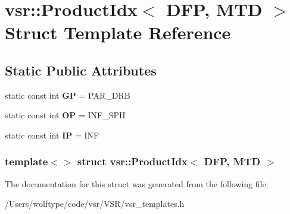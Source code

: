 \hypertarget{structvsr_1_1_product_idx_3_01_d_f_p_00_01_m_t_d_01_4}{\section{vsr\-:\-:Product\-Idx$<$ D\-F\-P, M\-T\-D $>$ Struct Template Reference}
\label{structvsr_1_1_product_idx_3_01_d_f_p_00_01_m_t_d_01_4}
}
\subsection*{Static Public Attributes}
\begin{DoxyCompactItemize}
\item 
\hypertarget{structvsr_1_1_product_idx_3_01_d_f_p_00_01_m_t_d_01_4_a7184cf9034f08618f0323b524c3aeefa}{static const int {\bfseries G\-P} = P\-A\-R\-\_\-\-D\-R\-B}\label{structvsr_1_1_product_idx_3_01_d_f_p_00_01_m_t_d_01_4_a7184cf9034f08618f0323b524c3aeefa}

\item 
\hypertarget{structvsr_1_1_product_idx_3_01_d_f_p_00_01_m_t_d_01_4_adbc8545fb0343cef9bbf375219e2a029}{static const int {\bfseries O\-P} = I\-N\-F\-\_\-\-S\-P\-H}\label{structvsr_1_1_product_idx_3_01_d_f_p_00_01_m_t_d_01_4_adbc8545fb0343cef9bbf375219e2a029}

\item 
\hypertarget{structvsr_1_1_product_idx_3_01_d_f_p_00_01_m_t_d_01_4_a17d82a1ccb0694bd093ae8bb2df9661e}{static const int {\bfseries I\-P} = I\-N\-F}\label{structvsr_1_1_product_idx_3_01_d_f_p_00_01_m_t_d_01_4_a17d82a1ccb0694bd093ae8bb2df9661e}

\end{DoxyCompactItemize}
\subsubsection*{template$<$$>$ struct vsr\-::\-Product\-Idx$<$ D\-F\-P, M\-T\-D $>$}



The documentation for this struct was generated from the following file\-:\begin{DoxyCompactItemize}
\item 
/\-Users/wolftype/code/vsr/\-V\-S\-R/vsr\-\_\-templates.\-h\end{DoxyCompactItemize}
